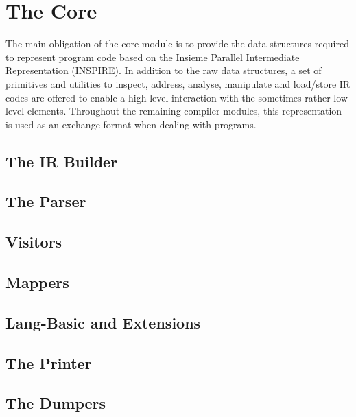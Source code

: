 \section{The Core}
The main obligation of the core module is to provide the data structures
required to represent program code based on the Insieme Parallel Intermediate
Representation (INSPIRE). In addition to the raw data structures, a set of
primitives and utilities to inspect, address, analyse, manipulate and load/store
IR codes are offered to enable a high level interaction with the sometimes rather
low-level elements. Throughout the remaining compiler modules, this
representation is used as an exchange format when dealing with programs.








\subsection{The IR Builder}
\label{sec:Compiler.Core.Builder}

\subsection{The Parser}
\label{sec:Compiler.Core.Parser}
\subsection{Visitors}
\label{sec:Compiler.Core.Visitors}
\subsection{Mappers}
\label{sec:Compiler.Core.Mappers}
\subsection{Lang-Basic and Extensions}
\label{sec:Compiler.Core.LangBasic}
\subsection{The Printer}
\label{sec:Compiler.Core.Printer}
\subsection{The Dumpers}
\label{sec:Compiler.Core.Dumpers}
